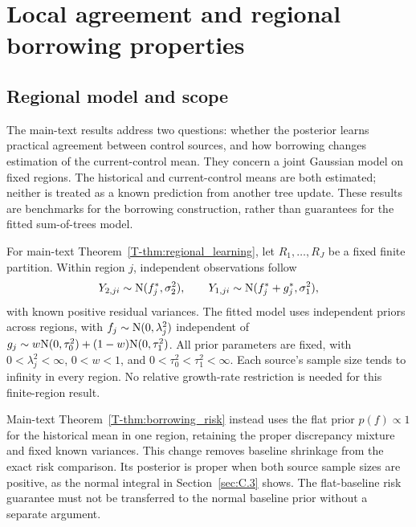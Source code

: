 \section{Local agreement and regional borrowing properties}\label{sec:C}
\subsection{Regional model and scope}\label{sec:C.1}
The main-text results address two questions: whether the posterior learns practical agreement between control sources, and how borrowing changes estimation of the current-control mean. They concern a joint Gaussian model on fixed regions. The historical and current-control means are both estimated; neither is treated as a known prediction from another tree update. These results are benchmarks for the borrowing construction, rather than guarantees for the fitted sum-of-trees model.

For main-text Theorem~\ref{T-thm:regional_learning}, let $R_1,\ldots,R_J$ be a fixed finite partition. Within region $j$, independent observations follow
\[
Y_{2,ji}\sim\mathrm{N}(f_j^*,\sigma_2^2),\qquad
Y_{1,ji}\sim\mathrm{N}(f_j^*+g_j^*,\sigma_1^2),
\]
with known positive residual variances. The fitted model uses independent priors across regions, with $f_j\sim\mathrm{N}(0,\lambda_j^2)$ independent of $g_j\sim w\mathrm{N}(0,\tau_0^2)+(1-w)\mathrm{N}(0,\tau_1^2)$. All prior parameters are fixed, with $0<\lambda_j^2<\infty$, $0<w<1$, and $0<\tau_0^2<\tau_1^2<\infty$. Each source's sample size tends to infinity in every region. No relative growth-rate restriction is needed for this finite-region result.

Main-text Theorem~\ref{T-thm:borrowing_risk} instead uses the flat prior $p(f)\propto1$ for the historical mean in one region, retaining the proper discrepancy mixture and fixed known variances. This change removes baseline shrinkage from the exact risk comparison. Its posterior is proper when both source sample sizes are positive, as the normal integral in Section~\ref{sec:C.3} shows. The flat-baseline risk guarantee must not be transferred to the normal baseline prior without a separate argument.

